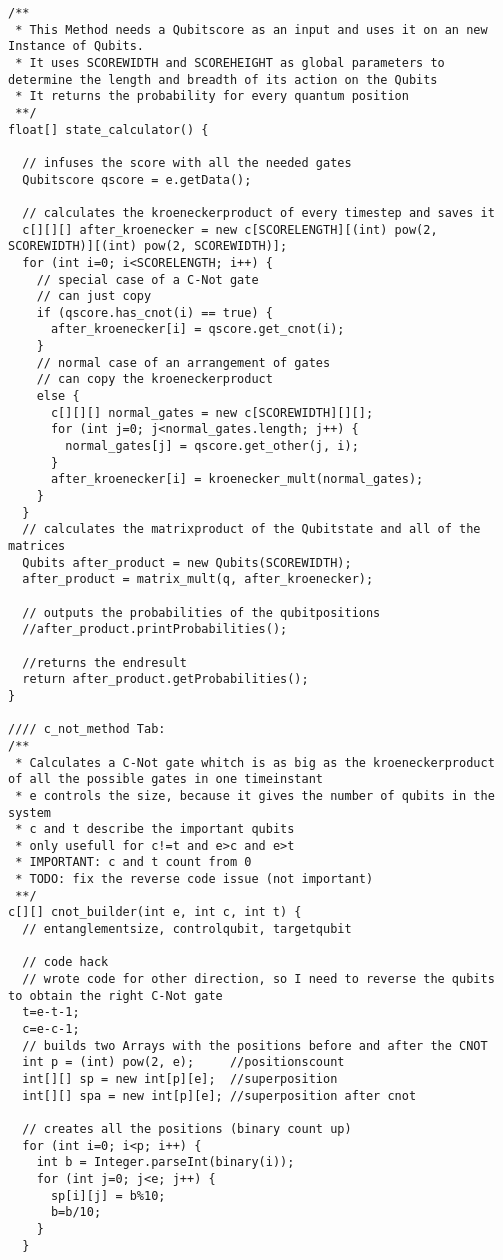 \documentclass[12pt]{report}
\begin{document}
\begin{lstlisting}
/**
 * This Method needs a Qubitscore as an input and uses it on an new Instance of Qubits.
 * It uses SCOREWIDTH and SCOREHEIGHT as global parameters to determine the length and breadth of its action on the Qubits
 * It returns the probability for every quantum position
 **/
float[] state_calculator() {

  // infuses the score with all the needed gates
  Qubitscore qscore = e.getData();

  // calculates the kroeneckerproduct of every timestep and saves it
  c[][][] after_kroenecker = new c[SCORELENGTH][(int) pow(2, SCOREWIDTH)][(int) pow(2, SCOREWIDTH)];
  for (int i=0; i<SCORELENGTH; i++) {
    // special case of a C-Not gate
    // can just copy
    if (qscore.has_cnot(i) == true) {
      after_kroenecker[i] = qscore.get_cnot(i);
    }
    // normal case of an arrangement of gates
    // can copy the kroeneckerproduct
    else {
      c[][][] normal_gates = new c[SCOREWIDTH][][];
      for (int j=0; j<normal_gates.length; j++) {
        normal_gates[j] = qscore.get_other(j, i);
      }
      after_kroenecker[i] = kroenecker_mult(normal_gates);
    }
  }
  // calculates the matrixproduct of the Qubitstate and all of the matrices
  Qubits after_product = new Qubits(SCOREWIDTH);
  after_product = matrix_mult(q, after_kroenecker);

  // outputs the probabilities of the qubitpositions
  //after_product.printProbabilities();

  //returns the endresult
  return after_product.getProbabilities();
}

//// c_not_method Tab:
/**
 * Calculates a C-Not gate whitch is as big as the kroeneckerproduct of all the possible gates in one timeinstant
 * e controls the size, because it gives the number of qubits in the system
 * c and t describe the important qubits
 * only usefull for c!=t and e>c and e>t
 * IMPORTANT: c and t count from 0
 * TODO: fix the reverse code issue (not important)
 **/
c[][] cnot_builder(int e, int c, int t) {
  // entanglementsize, controlqubit, targetqubit

  // code hack
  // wrote code for other direction, so I need to reverse the qubits to obtain the right C-Not gate
  t=e-t-1;
  c=e-c-1;
  // builds two Arrays with the positions before and after the CNOT
  int p = (int) pow(2, e);     //positionscount
  int[][] sp = new int[p][e];  //superposition
  int[][] spa = new int[p][e]; //superposition after cnot

  // creates all the positions (binary count up)
  for (int i=0; i<p; i++) {
    int b = Integer.parseInt(binary(i));
    for (int j=0; j<e; j++) {
      sp[i][j] = b%10;
      b=b/10;
    }
  }


\end{lstlisting}
\end{document}
